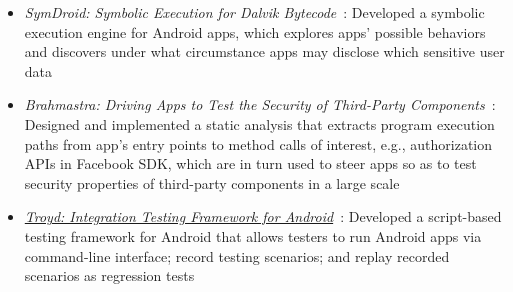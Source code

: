 \documentclass[letterpaper,11pt]{article}
\begin{document}
\begin{itemize}
{\begin{itemize}
\item\emph{SymDroid: Symbolic Execution for Dalvik Bytecode}~\cite{esorics15, esorics15-tr, symdroid}:
Developed a symbolic execution engine for Android apps,
which explores apps' possible behaviors and
discovers under what circumstance apps may disclose which sensitive user data

\item\emph{Brahmastra: Driving Apps to Test the Security of Third-Party Components}~\cite{security14}:
Designed and implemented a static analysis that extracts program execution paths
from app's entry points to method calls of interest, e.g., authorization APIs
in Facebook SDK, which are in turn used to steer apps so as to test
security properties of third-party components in a large scale

\item\emph{\href{https://github.com/plum-umd/troyd}{Troyd: Integration Testing Framework for Android}}~\cite{troyd}:
Developed a script-based testing framework for Android
that allows testers to run Android apps via command-line interface;
record testing scenarios; and replay recorded scenarios as regression tests


\end{itemize}}
\end{itemize}
\end{document}
